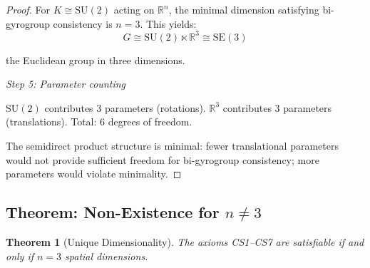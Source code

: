 \documentclass[11pt,a4paper]{article}
\newtheorem{theorem}{Theorem}
\theoremstyle{definition}
\theoremstyle{remark}
\begin{document}
\begin{proof}
For $K \cong \mathrm{SU}(2)$ acting on $\mathbb{R}^n$, the minimal dimension satisfying bi-gyrogroup consistency is $n = 3$. This yields:
\begin{equation}
G \cong \mathrm{SU}(2) \ltimes \mathbb{R}^3 \cong \mathrm{SE}(3)
\end{equation}

the Euclidean group in three dimensions.

\textit{Step 5: Parameter counting}

$\mathrm{SU}(2)$ contributes 3 parameters (rotations).
$\mathbb{R}^3$ contributes 3 parameters (translations).
Total: 6 degrees of freedom.

The semidirect product structure is minimal: fewer translational parameters would not provide sufficient freedom for bi-gyrogroup consistency; more parameters would violate minimality.
\end{proof}

\subsection{Theorem: Non-Existence for $n \neq 3$}

\begin{theorem}[Unique Dimensionality]
The axioms CS1--CS7 are satisfiable if and only if $n = 3$ spatial dimensions.
\end{theorem}
\end{document}
